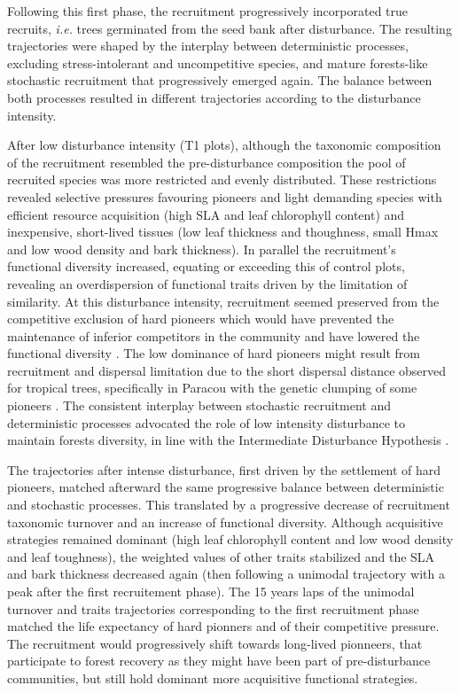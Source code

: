 \documentclass[fleqn,10pt]{ArtEcoFoG} %
\begin{document}
Following this first phase, the recruitment progressively incorporated
true recruits, \emph{i.e.} trees germinated from the seed bank after
disturbance. The resulting trajectories were shaped by the interplay
between deterministic processes, excluding stress-intolerant and
uncompetitive species, and mature forests-like stochastic recruitment
that progressively emerged again. The balance between both processes
resulted in different trajectories according to the disturbance
intensity.

After low disturbance intensity (T1 plots), although the taxonomic
composition of the recruitment resembled the pre-disturbance composition
the pool of recruited species was more restricted and evenly
distributed. These restrictions revealed selective pressures favouring
pioneers and light demanding species with efficient resource acquisition
(high SLA and leaf chlorophyll content) and inexpensive, short-lived
tissues (low leaf thickness and thoughness, small Hmax and low wood
density and bark thickness). In parallel the recruitment's functional
diversity increased, equating or exceeding this of control plots,
revealing an overdispersion of functional traits driven by the
limitation of similarity. At this disturbance intensity, recruitment
seemed preserved from the competitive exclusion of hard pioneers which
would have prevented the maintenance of inferior competitors in the
community and have lowered the functional diversity
\citep{Hubbell1999, Sheil2003, Bongers2009}. The low dominance of hard
pioneers might result from recruitment and dispersal limitation due to
the short dispersal distance observed for tropical trees, specifically
in Paracou with the genetic clumping of some pioneers
\citep{Leclerc2015, Scotti2015a}. The consistent interplay between
stochastic recruitment and deterministic processes advocated the role of
low intensity disturbance to maintain forests diversity, in line with
the Intermediate Disturbance Hypothesis \citep{Molino2001, Sheil2003}.

The trajectories after intense disturbance, first driven by the
settlement of hard pioneers, matched afterward the same progressive
balance between deterministic and stochastic processes. This translated
by a progressive decrease of recruitment taxonomic turnover and an
increase of functional diversity. Although acquisitive strategies
remained dominant (high leaf chlorophyll content and low wood density
and leaf toughness), the weighted values of other traits stabilized and
the SLA and bark thickness decreased again (then following a unimodal
trajectory with a peak after the first recruitement phase). The 15 years
laps of the unimodal turnover and traits trajectories corresponding to
the first recruitment phase matched the life expectancy of hard pionners
and of their competitive pressure. The recruitment would progressively
shift towards long-lived pionneers, that participate to forest recovery
as they might have been part of pre-disturbance communities, but still
hold dominant more acquisitive functional strategies.
\end{document}
